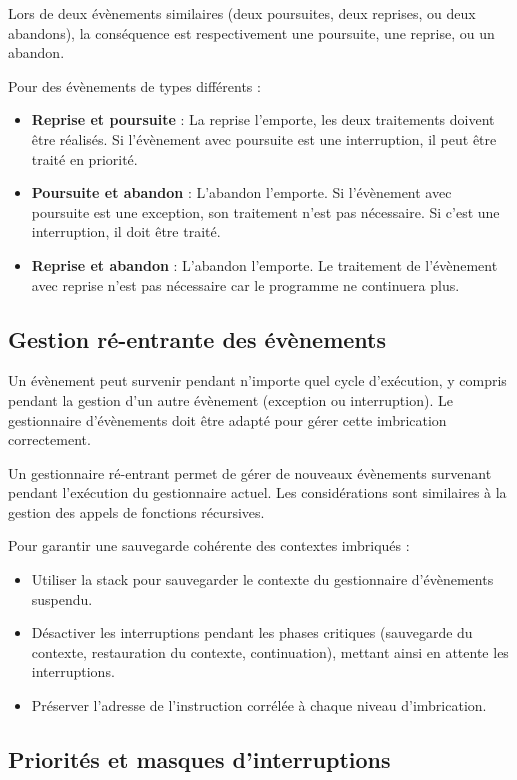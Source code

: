 Lors de deux évènements similaires (deux poursuites, deux reprises, ou deux abandons), la conséquence est respectivement une poursuite, une reprise, ou un abandon.

Pour des évènements de types différents :
\begin{itemize}
    \item \textbf{Reprise et poursuite} : La reprise l’emporte, les deux traitements doivent être réalisés. Si l'évènement avec poursuite est une interruption, il peut être traité en priorité.
    \item \textbf{Poursuite et abandon} : L’abandon l’emporte. Si l'évènement avec poursuite est une exception, son traitement n'est pas nécessaire. Si c'est une interruption, il doit être traité.
    \item \textbf{Reprise et abandon} : L’abandon l’emporte. Le traitement de l'évènement avec reprise n'est pas nécessaire car le programme ne continuera plus.
\end{itemize}



\subsection{Gestion ré-entrante des évènements}

Un évènement peut survenir pendant n'importe quel cycle d'exécution, y compris pendant la gestion d'un autre évènement (exception ou interruption). Le gestionnaire d'évènements doit être adapté pour gérer cette imbrication correctement.

Un gestionnaire ré-entrant permet de gérer de nouveaux évènements survenant pendant l'exécution du gestionnaire actuel. Les considérations sont similaires à la gestion des appels de fonctions récursives. 

Pour garantir une sauvegarde cohérente des contextes imbriqués :
\begin{itemize}
    \item Utiliser la stack pour sauvegarder le contexte du gestionnaire d'évènements suspendu.
    \item Désactiver les interruptions pendant les phases critiques (sauvegarde du contexte, restauration du contexte, continuation), mettant ainsi en attente les interruptions.
    \item Préserver l'adresse de l'instruction corrélée à chaque niveau d'imbrication.
\end{itemize}

\subsection{Priorités et masques d'interruptions}

